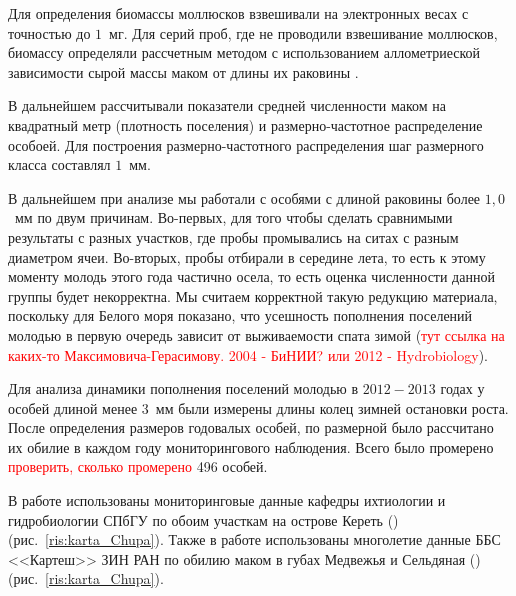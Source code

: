 Для определения биомассы моллюсков взвешивали на электронных весах с точностью до $1$~мг. 
Для серий проб, где не проводили взвешивание моллюсков, биомассу определяли рассчетным методом с использованием аллометриеской зависимости сырой массы маком от длины их раковины \cite{Maximovich_et_al_1993}.

В дальнейшем рассчитывали показатели средней численности маком на квадратный метр (плотность поселения) и размерно-частотное распределение особоей.
Для построения размерно-частотного распределения шаг размерного класса составлял $1$~мм.

В дальнейшем при анализе мы работали с особями с длиной раковины более $1,0$~мм по двум причинам. 
Во-первых, для того чтобы сделать сравнимыми результаты с разных участков, где пробы промывались на ситах с разным диаметром ячеи. 
Во-вторых, пробы отбирали в середине лета, то есть к этому моменту молодь этого года частично осела, то есть оценка численности данной группы будет некорректна.
Мы считаем корректной такую редукцию материала, поскольку для Белого моря показано, что усешность пополнения поселений молодью в первую очередь зависит от выживаемости спата зимой (\textcolor{red}{тут ссылка на каких-то Максимовича-Герасимову. 2004 - БиНИИ? или 2012 - Hydrobiology}).

Для анализа динамики пополнения поселений молодью в $2012 - 2013$ годах у особей длиной менее $3$~мм были измерены длины колец зимней остановки роста. 
После определения размеров годовалых особей, по размерной было рассчитано их обилие в каждом году мониторингового наблюдения.
Всего было промерено \textcolor{red}{проверить, сколько промерено} 496 особей.



В работе использованы мониторинговые данные кафедры ихтиологии и гидробиологии СПбГУ по обоим участкам на острове Кереть (\cite{Maximovich_et_al_1991, Gerasimova_Maximovich_2013}) (рис.~\ref{ris:karta_Chupa}). 
Также в работе использованы многолетие данные ББС <<Картеш>> ЗИН РАН по обилию маком в губах Медвежья и Сельдяная (\cite{Varfolomeeva_Naumov_2013}) (рис.~\ref{ris:karta_Chupa}).


 



